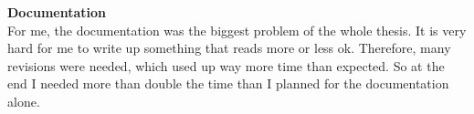 \documentclass[
	a4paper               %
	,BCOR=0mm            %
	,bibliography=totoc   %
	,listof=totoc         %
	,monolingual
	,twoside=false
]{bfhthesis}              %
\begin{document}
\noindent
\textbf{Documentation}\\
For me, the documentation was the biggest problem of the whole thesis. It is very hard for me to write up something that reads more or less ok. Therefore, many revisions were needed, which used up way more time than expected. So at the end I needed more than double the time than I planned for the documentation alone.




\end{document}
